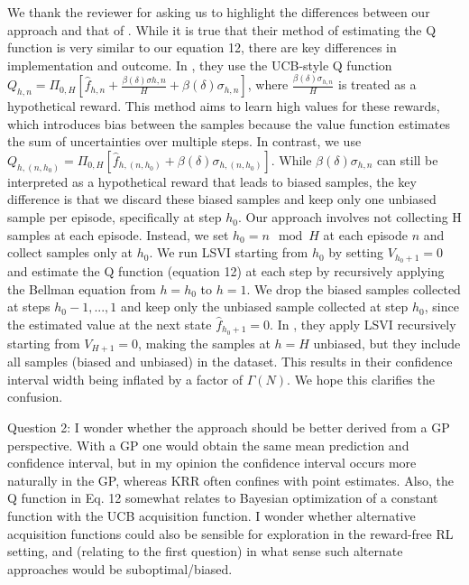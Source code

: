 \documentclass{article}
\begin{document}
We thank the reviewer for asking us to highlight the differences between our approach and that of \cite{qiu2021reward}. While it is true that their method of estimating the Q function is very similar to our equation 12, there are key differences in implementation and outcome. In \cite{qiu2021reward}, they use the UCB-style Q function $Q_{h,n} = \Pi_{0,H} \left[ \hat{f}_{h,n} + \frac{\beta(\delta) \sigma{h,n}}{H} + \beta(\delta) \sigma_{h,n} \right]$, where $\frac{\beta(\delta) \sigma_{h,n}}{H}$ is treated as a hypothetical reward. This method aims to learn high values for these rewards, which introduces bias between the samples because the value function estimates the sum of uncertainties over multiple steps.
In contrast, we use $Q_{h,(n,h_0)} = \Pi_{0,H} \left[ \hat{f}_{h,(n,h_0)} + \beta(\delta) \sigma_{h,(n,h_0)} \right]$. While $\beta(\delta) \sigma_{h,n}$ can still be interpreted as a hypothetical reward that leads to biased samples, the key difference is that we discard these biased samples and keep only one unbiased sample per episode, specifically at step $h_0$.
Our approach involves not collecting H samples at each episode. Instead, we set $h_0 = n \mod H$ at each episode $n$ and collect samples only at $h_0$. We run LSVI starting from $h_0$ by setting $V_{h_0+1} = 0$ and estimate the Q function (equation 12) at each step by recursively applying the Bellman equation from $h = h_0$ to $h = 1$.  We drop the biased samples collected at steps $h_0-1, ..., 1$ and keep only the unbiased sample collected at step $h_0$, since the estimated value at the next state $\hat{f}_{h_0+1} = 0$.
In \cite{qiu2021reward}, they apply LSVI recursively starting from $V_{H+1} = 0$, making the samples at $h = H$ unbiased, but they include all samples (biased and unbiased) in the dataset. This results in their confidence interval width being inflated by a factor of $\Gamma(N)$. We hope this clarifies the confusion.

Question 2: I wonder whether the approach should be better derived from a GP perspective. With a GP one would obtain the same mean prediction and confidence interval, but in my opinion the confidence interval occurs more naturally in the GP, whereas KRR often confines with point estimates. Also, the Q function in Eq. 12 somewhat relates to Bayesian optimization of a constant function with the UCB acquisition function. I wonder whether alternative acquisition functions could also be sensible for exploration in the reward-free RL setting, and (relating to the first question) in what sense such alternate approaches would be suboptimal/biased.
\end{document}
